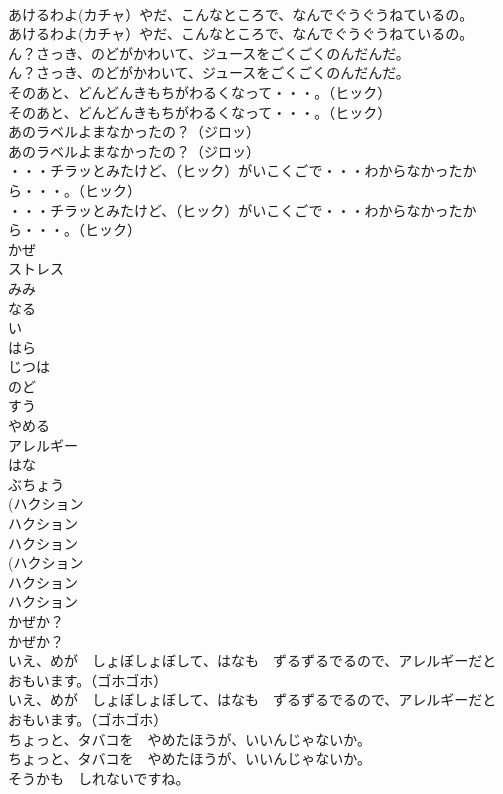 \documentclass[8pt]{extreport}
\begin{document}
\begin{CJK}{UTF8}{min}
\\	あけるわよ(カチャ）やだ、こんなところで、なんでぐうぐうねているの。
\\	あけるわよ(カチャ）やだ、こんなところで、なんでぐうぐうねているの。
\\	ん？さっき、のどがかわいて、ジュースをごくごくのんだんだ。
\\	ん？さっき、のどがかわいて、ジュースをごくごくのんだんだ。
\\	そのあと、どんどんきもちがわるくなって・・・。（ヒック）
\\	そのあと、どんどんきもちがわるくなって・・・。（ヒック）
\\	あのラベルよまなかったの？（ジロッ）
\\	あのラベルよまなかったの？（ジロッ）
\\	・・・チラッとみたけど、（ヒック）がいこくごで・・・わからなかったから・・・。（ヒック）
\\	・・・チラッとみたけど、（ヒック）がいこくごで・・・わからなかったから・・・。（ヒック）
\\	かぜ
\\	ストレス
\\	みみ
\\	なる
\\	い
\\	はら
\\	じつは
\\	のど
\\	すう
\\	やめる
\\	アレルギー
\\	はな
\\	ぶちょう
\\	(ハクション
\\	ハクション
\\	ハクション
\\	(ハクション
\\	ハクション
\\	ハクション
\\	かぜか？
\\	かぜか？
\\	いえ、めが　しょぼしょぼして、はなも　ずるずるでるので、アレルギーだと　おもいます。（ゴホゴホ）
\\	いえ、めが　しょぼしょぼして、はなも　ずるずるでるので、アレルギーだと　おもいます。（ゴホゴホ）
\\	ちょっと、タバコを　やめたほうが、いいんじゃないか。
\\	ちょっと、タバコを　やめたほうが、いいんじゃないか。
\\	そうかも　しれないですね。

\end{CJK}
\end{document}
